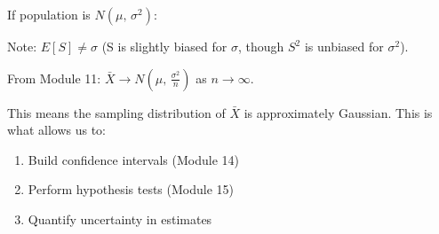 
If population is $N(\mu,\, \sigma^{2})$:



Note: $E[S] \ne \sigma$ (S is slightly biased for $\sigma$, though $S^{2}$ is unbiased for $\sigma^{2}$).


From Module 11: $\bar{X} \to N\left(\mu,\, \frac{\sigma^{2}}{n}\right)$ as $n \to \infty$.

This means the sampling distribution of $\bar{X}$ is approximately Gaussian. This is what allows us to:

\begin{enumerate}
\def\labelenumi{\arabic{enumi}.}
\tightlist
\item
  Build confidence intervals (Module 14)
\item
  Perform hypothesis tests (Module 15)
\item
  Quantify uncertainty in estimates
\end{enumerate}


